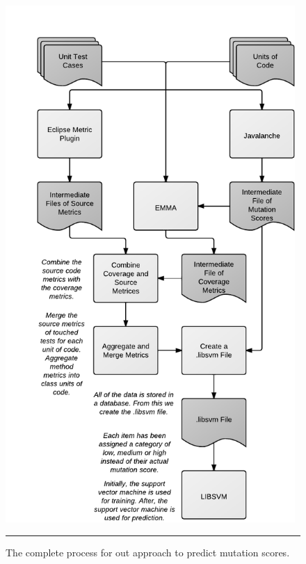 \begin{figure}[H]
  \centering
  \includegraphics[width=11cm]{figures/process.pdf}
  \caption{The complete process for out approach to predict mutation scores.}
  \label{fig:process}
  \vspace{2mm}
  \hrule
\end{figure}


